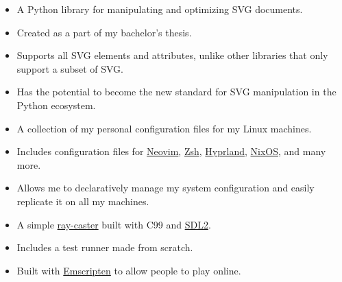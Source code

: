 \documentclass[10pt,a4paper,ragged2e,withhyper]{altacv}
\begin{document}
\begin{paracol}{2}
	\medskip
	\smallskip

	\medskip

	\medskip

	\begin{itemize}
		\item A Python library for manipulating and optimizing SVG documents.
		\item Created as a part of my bachelor's thesis.
		\item Supports all SVG elements and attributes, unlike other libraries that only support a subset of SVG.
		\item Has the potential to become the new standard for SVG manipulation in the Python ecosystem.
	\end{itemize}

	\divider

	\begin{itemize}
		\item A collection of my personal configuration files for my Linux machines.
		\item Includes configuration files for \href{https://neovim.io/}{Neovim}, \href{https://www.zsh.org/}{Zsh}, \href{https://hyprland.org/}{Hyprland}, \href{https://nixos.org/}{NixOS}, and many more.
		\item Allows me to declaratively manage my system configuration and easily replicate it on all my machines.
	\end{itemize}

	\divider

	\begin{itemize}
		\item A simple \href{https://en.wikipedia.org/wiki/Ray_casting}{ray-caster} built with C99 and \href{https://www.libsdl.org/}{SDL2}.
		\item Includes a test runner made from scratch.
		\item Built with \href{https://emscripten.org/}{Emscripten} to allow people to play online.
	\end{itemize}
\end{paracol}
\end{document}
